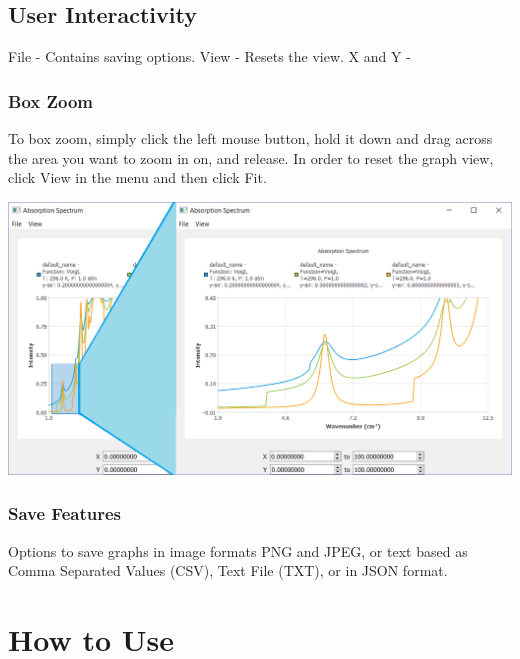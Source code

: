 \documentclass[12pt]{article}
\begin{document}
\subsection{User Interactivity}
File - Contains saving options.
View - Resets the view.
X and Y -
\subsubsection{Box Zoom}
To box zoom, simply click the left mouse button, hold it down and drag across the area you want to zoom in on, and release. In order to reset the graph view, click View in the menu and then click Fit.
\begin{center}
\includegraphics[scale = 0.5]{GraphDemo}
\end{center}
\subsubsection{Save Features}
Options to save graphs in image formats PNG and JPEG, or  text based as Comma Separated Values (CSV), Text File (TXT), or in JSON format.

\section{How to Use}
\end{document}
